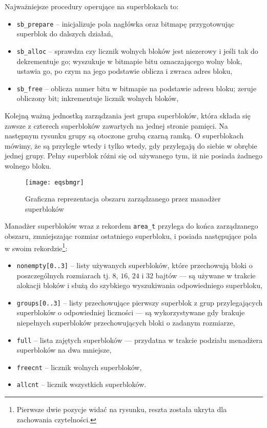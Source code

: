 \documentclass[12pt,a4paper,titlepage,twoside]{mwart}
\begin{document}
Najważniejsze procedury operujące na superblokach to:
\begin{itemize}
\item \verb+sb_prepare+ -- inicjalizuje pola nagłówka oraz bitmapę
przygotowując superblok do dalszych działań,
\item \verb+sb_alloc+ -- sprawdza czy licznik wolnych bloków jest niezerowy i
jeśli tak do dekrementuje go; wyszukuje w bitmapie bitu oznaczającego wolny
blok, ustawia go, po czym na jego podstawie oblicza i zwraca adres bloku,
\item \verb+sb_free+ -- oblicza numer bitu w bitmapie na podstawie adresu
bloku; zeruje obliczony bit; inkrementuje licznik wolnych bloków,
\end{itemize}

Kolejną ważną jednostką zarządzania jest grupa superbloków, która składa się
zawsze z czterech superbloków zawartych na jednej stronie pamięci. Na następnym
rysunku grupy są otoczone grubą czarną ramką. O superblokach mówimy, że są
przyległe wtedy i tylko wtedy, gdy przylegają do siebie w obrębie jednej grupy.
Pełny superblok różni się od używanego tym, iż nie posiada żadnego wolnego bloku.

\begin{figure}[ht]
\centering
\texttt{[image: eqsbmgr]}
\caption{Graficzna reprezentacja obszaru zarządzanego przez manadżer superbloków}
\end{figure}

Manadżer superbloków wraz z rekordem \texttt{area\_t} przylega do końca
zarządzanego obszaru, zmniejszając rozmiar ostatniego superbloku, i posiada
następujące pola w swoim rekordzie\footnote{Pierwsze dwie pozycje widać na
rysunku, reszta została ukryta dla zachowania czytelności.}:
\begin{itemize}
\item \verb+nonempty[0..3]+ -- listy używanych superbloków, które przechowują
bloki o poszczególnych rozmiarach tj. $8$, $16$, $24$ i $32$ bajtów --- są
używane w trakcie alokacji bloków i służą do szybkiego wyszukiwania
odpowiedniego superbloku,
\item \verb+groups[0..3]+ -- listy przechowujące pierwszy superblok z grup
przylegających superbloków o odpowiedniej liczności --- są wykorzystywane gdy
brakuje niepełnych superbloków przechowujących bloki o zadanym rozmiarze,
\item \verb+full+ -- lista zajętych superbloków --- przydatna w trakcie
podziału menadżera superbloków na dwa mniejsze,
\item \verb+freecnt+ -- licznik wolnych superbloków,
\item \verb+allcnt+ -- licznik wszystkich superbloków.
\end{itemize}
\end{document}
